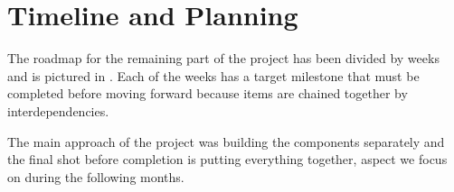 \chapter{Timeline and Planning}
\label{chapter:timeline-planning}

The roadmap for the remaining part of the project has been divided by weeks and is pictured in .
Each of the weeks has a target milestone that must be completed before moving forward because  items are chained together by interdependencies.


The main approach of the project was building the components separately and the final shot before completion is putting everything together, aspect we focus on during the following months.
